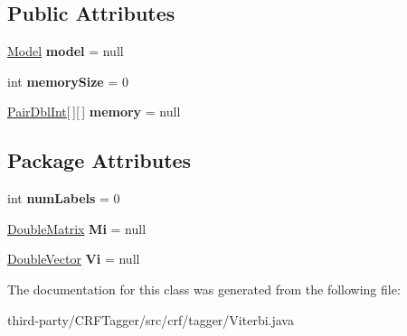 \subsection*{Public Attributes}
\begin{DoxyCompactItemize}
\item 
\hypertarget{classcrf_1_1tagger_1_1Viterbi_a40a610b979d8587f13bc230ee2d91e77}{
\hyperlink{classcrf_1_1tagger_1_1Model}{Model} {\bfseries model} = null}
\label{classcrf_1_1tagger_1_1Viterbi_a40a610b979d8587f13bc230ee2d91e77}

\item 
\hypertarget{classcrf_1_1tagger_1_1Viterbi_a4535e69e4d57c2baaac4edb772bf1762}{
int {\bfseries memorySize} = 0}
\label{classcrf_1_1tagger_1_1Viterbi_a4535e69e4d57c2baaac4edb772bf1762}

\item 
\hypertarget{classcrf_1_1tagger_1_1Viterbi_a5d7c4bc568e6501b177ce6263cf8fc7a}{
\hyperlink{classcrf_1_1tagger_1_1Viterbi_1_1PairDblInt}{PairDblInt}\mbox{[}$\,$\mbox{]}\mbox{[}$\,$\mbox{]} {\bfseries memory} = null}
\label{classcrf_1_1tagger_1_1Viterbi_a5d7c4bc568e6501b177ce6263cf8fc7a}

\end{DoxyCompactItemize}
\subsection*{Package Attributes}
\begin{DoxyCompactItemize}
\item 
\hypertarget{classcrf_1_1tagger_1_1Viterbi_a8c9a4848e6405d14d0124cf0686bd457}{
int {\bfseries numLabels} = 0}
\label{classcrf_1_1tagger_1_1Viterbi_a8c9a4848e6405d14d0124cf0686bd457}

\item 
\hypertarget{classcrf_1_1tagger_1_1Viterbi_a64b50a4ab5e1e0e7ca99010f16a7d8fa}{
\hyperlink{classcrf_1_1tagger_1_1DoubleMatrix}{DoubleMatrix} {\bfseries Mi} = null}
\label{classcrf_1_1tagger_1_1Viterbi_a64b50a4ab5e1e0e7ca99010f16a7d8fa}

\item 
\hypertarget{classcrf_1_1tagger_1_1Viterbi_a79fdc992402a99918ab4da96b140a145}{
\hyperlink{classcrf_1_1tagger_1_1DoubleVector}{DoubleVector} {\bfseries Vi} = null}
\label{classcrf_1_1tagger_1_1Viterbi_a79fdc992402a99918ab4da96b140a145}

\end{DoxyCompactItemize}


The documentation for this class was generated from the following file:\begin{DoxyCompactItemize}
\item 
third-\/party/CRFTagger/src/crf/tagger/Viterbi.java\end{DoxyCompactItemize}
